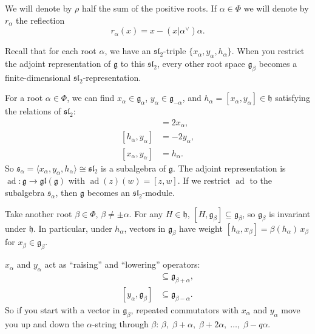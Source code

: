 \documentclass[12pt]{article}
\begin{document}
We will denote by $\rho$ half the sum of the positive roots. If $\alpha \in \Phi$ we will denote by $r_\alpha$ the reflection
\[
    r_\alpha(x) = x - (x|\alpha^\vee)\alpha.
\]

\begin{remark}
    Recall that for each root $\alpha$, we have an $\mathfrak{sl}_2$-triple $\{x_\alpha, y_\alpha, h_\alpha\}$. When you restrict the adjoint representation of $\mathfrak{g}$ to this $\mathfrak{sl}_2$, every other root space $\mathfrak{g}_\beta$ becomes a finite-dimensional $\mathfrak{sl}_2$-representation.

    For a root $\alpha \in \Phi$, we can find $x_\alpha \in \mathfrak{g}_\alpha$, $y_\alpha \in \mathfrak{g}_{-\alpha}$, and $h_\alpha = [x_\alpha, y_\alpha] \in \mathfrak{h}$ satisfying the relations of $\mathfrak{sl}_2$:
    \begin{align*}
        [h_\alpha, x_\alpha] & = 2x_\alpha,  \\
        [h_\alpha, y_\alpha] & = -2y_\alpha, \\
        [x_\alpha, y_\alpha] & = h_\alpha.
    \end{align*}
    So $\mathfrak{s}_\alpha = \langle x_\alpha, y_\alpha, h_\alpha\rangle \cong \mathfrak{sl}_2$ is a subalgebra of $\mathfrak{g}$. The adjoint representation is $\operatorname{ad}: \mathfrak{g} \to \mathfrak{gl}(\mathfrak{g})$ with $\operatorname{ad}(z)(w) = [z, w]$. If we restrict $\operatorname{ad}$ to the subalgebra $\mathfrak{s}_\alpha$, then $\mathfrak{g}$ becomes an $\mathfrak{sl}_2$-module.

    Take another root $\beta \in \Phi$, $\beta \neq \pm\alpha$. For any $H \in \mathfrak{h}$, $[H, \mathfrak{g}_\beta] \subseteq \mathfrak{g}_\beta$, so $\mathfrak{g}_\beta$ is invariant under $\mathfrak{h}$. In particular, under $h_\alpha$, vectors in $\mathfrak{g}_\beta$ have weight $[h_\alpha, x_\beta] = \beta(h_\alpha)\,x_\beta$ for $x_\beta \in \mathfrak{g}_\beta$.

    $x_\alpha$ and $y_\alpha$ act as “raising” and “lowering” operators:
    \begin{align*}
        [x_\alpha, \mathfrak{g}_\beta] & \subseteq \mathfrak{g}_{\beta+\alpha}, \\
        [y_\alpha, \mathfrak{g}_\beta] & \subseteq \mathfrak{g}_{\beta-\alpha}.
    \end{align*}
    So if you start with a vector in $\mathfrak{g}_\beta$, repeated commutators with $x_\alpha$ and $y_\alpha$ move you up and down the $\alpha$-string through $\beta$: $\beta, \;\beta+\alpha, \;\beta+2\alpha, \;\dots,\;\beta-q\alpha$.


\end{remark}
\end{document}
